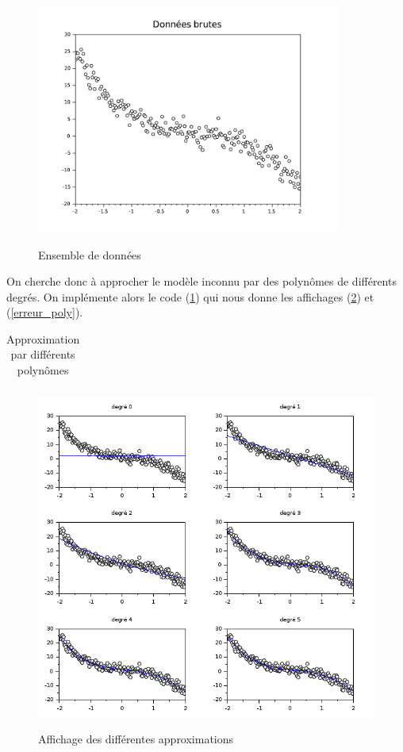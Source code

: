 \documentclass[a4paper,10pt]{report}
\begin{document}
\begin{figure}[H]
\centering
\caption{Ensemble de données}
\includegraphics[width=10cm]{donnes_brutes.pdf}
\label{donnes_graph}
\end{figure}

On cherche donc à approcher le modèle inconnu par des polynômes de différents degrés. On implémente alors le code (\ref{diff_poly}) qui nous donne les affichages  (\ref{graph_diff_poly}) et (\ref{erreur_poly}).
\begin{table}[H]
\caption{Approximation par différents polynômes}
\begin{tabular}{l}

\label{diff_poly}
\end{tabular}
\end{table}

\begin{figure}[H]
\centering
\caption{Affichage des différentes approximations}
\includegraphics[width=\textwidth]{graph_diff_poly.png}
\label{graph_diff_poly}
\end{figure}
\end{document}
